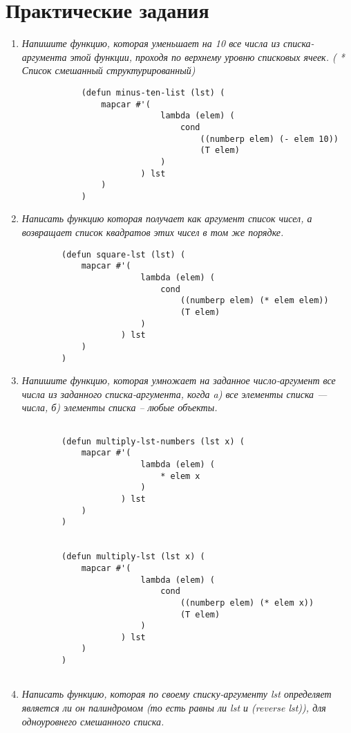 \chapter{Практические задания}

\begin{enumerate}[wide=0pt]

	\item \textit{Напишите функцию, которая уменьшает на 10 все числа из списка-аргумента этой
	функции, проходя по верхнему уровню списковых ячеек. ( * Список смешанный
	структурированный)}

		\begin{lstlisting}
			(defun minus-ten-list (lst) (
				mapcar #'(
							lambda (elem) (
								cond 
									((numberp elem) (- elem 10))
									(T elem)
							)
						) lst
				)
			)
		\end{lstlisting}



	\item  \textit{Написать функцию которая получает как аргумент список чисел, а возвращает список
	квадратов этих чисел в том же порядке.}

	\begin{lstlisting}
		(defun square-lst (lst) (
			mapcar #'(
						lambda (elem) (
							cond 
								((numberp elem) (* elem elem))
								(T elem)
						)
					) lst
			)
		)

	\end{lstlisting}

	\item  \textit{Напишите функцию, которая умножает на заданное число-аргумент все числа из
	заданного списка-аргумента, когда
	a) все элементы списка --- числа,
	б) элементы списка -- любые объекты.}

	\begin{lstlisting}

		(defun multiply-lst-numbers (lst x) (
			mapcar #'(
						lambda (elem) (
							* elem x
						)
					) lst
			)
		)


		(defun multiply-lst (lst x) (
			mapcar #'(
						lambda (elem) (
							cond 
								((numberp elem) (* elem x))
								(T elem)
						)
					) lst
			)
		)


	\end{lstlisting}



	\item  \textit{Написать функцию, которая по своему списку-аргументу lst определяет является ли он
	палиндромом (то есть равны ли lst и (reverse lst)), для одноуровнего смешанного
	списка.}


\end{enumerate}
